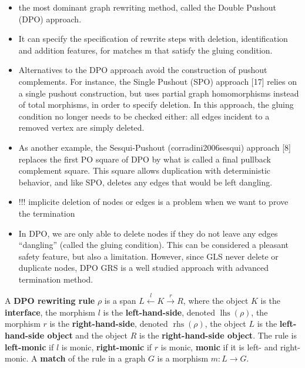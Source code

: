 \documentclass{book}
\begin{document}
    \begin{itemize}
      \item the most dominant graph rewriting method, called the Double Pushout (DPO) approach.
      \item It can  specify the specification of rewrite steps with deletion, identification and addition features, for matches m that satisfy the gluing condition.
      \item Alternatives to the DPO approach avoid the construction of pushout complements. For instance, the Single Pushout (SPO) approach [17] relies on a single pushout construction, but uses partial graph homomorphisms instead of total morphisms, in order to specify deletion. In this approach, the gluing condition no longer needs to be checked either: all edges incident to a removed vertex are simply deleted.
      \item As another example, the Sesqui-Pushout (corradini2006sesqui) approach [8] replaces the first PO square of DPO by what is called a final pullback complement square. This square allows duplication with deterministic behavior, and like SPO, deletes any edges that would be left dangling.
      \item !!! implicite deletion of nodes or edges is a problem when we want to prove the termination 
      \item In DPO, we are only able to delete nodes if they do not leave any edges “dangling” (called the gluing condition). This can be considered a pleasant safety feature, but also a limitation. However, since GLS never delete or duplicate nodes, DPO GRS is a well studied approach with advanced termination method.
    \end{itemize}

    \begin{definition}
        \label{def:grs:dpo_rule}
      A \textbf{DPO rewriting rule} $\rho$ is a span \( L \overset{l}{\leftarrow} K \overset{r}{\rightarrow} R \), where       
      the object \( K \) is the \textbf{interface}, 
      the morphism \( l \) is the \textbf{left-hand-side}, denoted \( \operatorname{lhs}(\rho) \),
      the morphism \( r \) is the \textbf{right-hand-side}, denoted \( \operatorname{rhs}(\rho) \),
      the object \( L \) is the \textbf{left-hand-side object} and the object \( R \) is the \textbf{right-hand-side object}. The rule is \textbf{left-monic} if \( l \) is monic, \textbf{right-monic} if \( r \) is monic, \textbf{monic} if it is left- and right-monic.
      A \textbf{match} of the rule in a graph \( G \) is a morphism \( m: L \rightarrow G \).   
      \end{definition}
    
\end{document}
